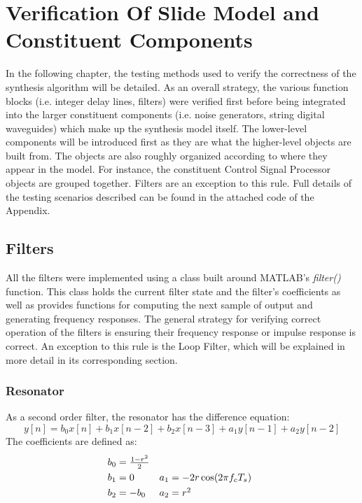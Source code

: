 \documentclass[../main.tex]{subfiles}
\begin{document}
\chapter{Verification Of Slide Model and Constituent Components}

In the following chapter, the testing methods used to verify the correctness of the synthesis algorithm will be detailed. As an overall strategy, the various function blocks (i.e. integer delay lines, filters) were verified first before being integrated into the larger constituent components (i.e. noise generators, string digital waveguides) which make up the synthesis model itself. The lower-level components will be introduced first as they are what the higher-level objects are built from. The objects are also roughly organized according to where they appear in the model. For instance, the constituent Control Signal Processor objects are grouped together. Filters are an exception to this rule. Full details of the testing scenarios described can be found in the attached code of the Appendix.

\section{Filters}
All the filters were implemented using a class built around MATLAB's \emph{filter()} function. This class holds the current filter state and the filter's coefficients as well as provides functions for computing the next sample of output and generating frequency responses. The general strategy for verifying correct operation of the filters is ensuring their frequency response or impulse response is correct. An exception to this rule is the Loop Filter, which will be explained in more detail in its corresponding section.

\subsection{Resonator}
As a second order filter, the resonator has the difference equation:
\begin{equation}
    y[n] = b_0 x[n] + b_1 x[n-2] + b_2 x[n-3] + a_1 y[n-1] + a_2 y[n-2]
\end{equation}
The coefficients are defined as:
\begin{equation}
\def\arraystretch{1.3}
\begin{array}{@{}lll@{}}
    b_0 = \frac{1-r^2}{2} & \\
    b_1 = 0 & a_1 = -2r\cos(2\pi f_c T_s)\\
    b_2 = -b_0 & a_2 = r^2\\
\end{array}
\end{equation}
\end{document}

